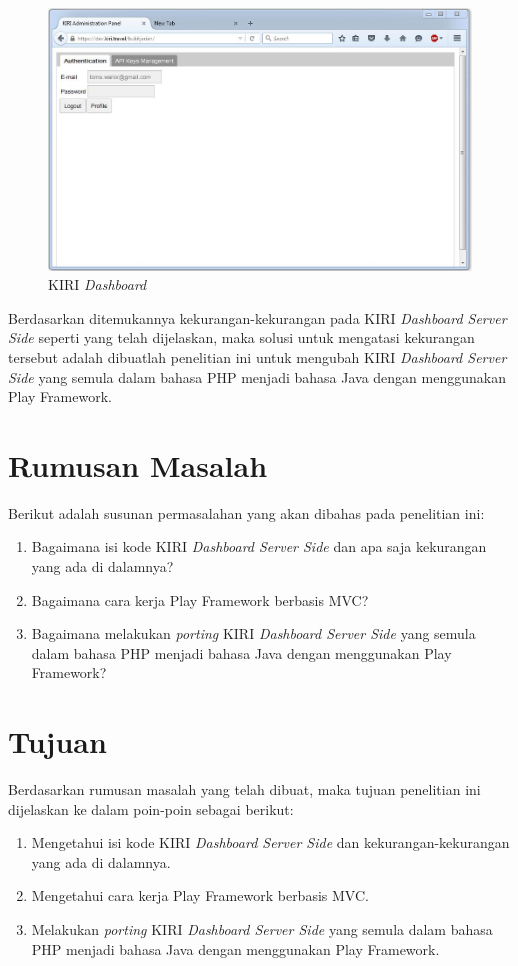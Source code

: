 \begin{figure}[htbp]
	\centering
		\includegraphics[scale=0.5]{Gambar/1_kiridashboard.JPG}
	\caption{KIRI \textit{Dashboard}\cite{devkiritravel}}
	\label{fig:1_kiridashboard}
\end{figure}

Berdasarkan ditemukannya kekurangan-kekurangan pada KIRI \textit{Dashboard Server Side} seperti yang telah dijelaskan, maka solusi untuk mengatasi kekurangan tersebut adalah dibuatlah penelitian ini untuk mengubah KIRI \textit{Dashboard Server Side} yang semula dalam bahasa PHP menjadi bahasa Java dengan menggunakan Play Framework.

\section{Rumusan Masalah}
\label{sec:rumusan_masalah}
Berikut adalah susunan permasalahan yang akan dibahas pada penelitian ini:
	\begin{enumerate}
		\item Bagaimana isi kode KIRI \textit{Dashboard Server Side} dan apa saja kekurangan yang ada di dalamnya?
		\item Bagaimana cara kerja Play Framework berbasis MVC?
		\item Bagaimana melakukan \textit{porting} KIRI \textit{Dashboard Server Side} yang semula dalam bahasa PHP menjadi bahasa
Java dengan menggunakan Play Framework?
	\end{enumerate}
	
\section{Tujuan}
\label{sec:tujuan}
Berdasarkan rumusan masalah yang telah dibuat, maka tujuan penelitian ini dijelaskan ke dalam poin-poin sebagai berikut:
	\begin{enumerate}
		\item Mengetahui isi kode KIRI \textit{Dashboard Server Side} dan kekurangan-kekurangan yang ada di dalamnya.
		\item Mengetahui cara kerja Play Framework berbasis MVC.
		\item Melakukan \textit{porting} KIRI \textit{Dashboard Server Side} yang semula dalam bahasa PHP menjadi bahasa
Java dengan menggunakan Play Framework.
	\end{enumerate}
	
